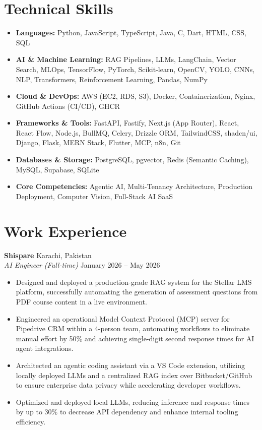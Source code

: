 \documentclass[11pt, a4paper]{article}
\begin{document}
\section*{Technical Skills}
\begin{itemize}[leftmargin=0.15in, label={}]
    \item \textbf{Languages:} Python, JavaScript, TypeScript, Java, C, Dart, HTML, CSS, SQL
    \item \textbf{AI \& Machine Learning:} RAG Pipelines, LLMs, LangChain, Vector Search, MLOps, TensorFlow, PyTorch, Scikit-learn, OpenCV, YOLO, CNNs, NLP, Transformers, Reinforcement Learning, Pandas, NumPy
    \item \textbf{Cloud \& DevOps:} AWS (EC2, RDS, S3), Docker, Containerization, Nginx, GitHub Actions (CI/CD), GHCR
    \item \textbf{Frameworks \& Tools:} FastAPI, Fastify, Next.js (App Router), React, React Flow, Node.js, BullMQ, Celery, Drizzle ORM, TailwindCSS, shadcn/ui, Django, Flask, MERN Stack, Flutter, MCP, n8n, Git
    \item \textbf{Databases \& Storage:} PostgreSQL, pgvector, Redis (Semantic Caching), MySQL, Supabase, SQLite
    \item \textbf{Core Competencies:} Agentic AI, Multi-Tenancy Architecture, Production Deployment, Computer Vision, Full-Stack AI SaaS
\end{itemize}

\section*{Work Experience}

\textbf{Shispare} \hfill Karachi, Pakistan \\
\textit{AI Engineer (Full-time)} \hfill January 2026 -- May 2026
\begin{itemize}[leftmargin=0.25in, itemsep=2pt]
    \item Designed and deployed a production-grade RAG system for the Stellar LMS platform, successfully automating the generation of assessment questions from PDF course content in a live environment.
    \item Engineered an operational Model Context Protocol (MCP) server for Pipedrive CRM within a 4-person team, automating workflows to eliminate manual effort by 50\% and achieving single-digit second response times for AI agent integrations.
    \item Architected an agentic coding assistant via a VS Code extension, utilizing locally deployed LLMs and a centralized RAG index over Bitbucket/GitHub to ensure enterprise data privacy while accelerating developer workflows.
    \item Optimized and deployed local LLMs, reducing inference and response times by up to 30\% to decrease API dependency and enhance internal tooling efficiency.
\end{itemize}
\end{document}
